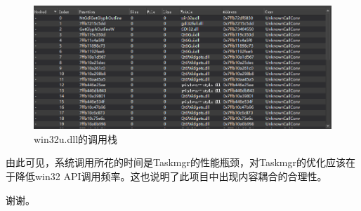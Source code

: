 \documentclass{beamer}
\begin{document}
\begin{frame}
    \begin{figure}
        \centering
        \includegraphics[scale=0.33]{../media/performance analyze/14.878s sampling result 2 callstuck.png}
        \caption{win32u.dll的调用栈}
        \label{fig:qorbit.2}
    \end{figure}
    
    由此可见，系统调用所花的时间是Taskmgr的性能瓶颈，对Taskmgr的优化应该在于降低win32 API调用频率。这也说明了此项目中出现内容耦合的合理性。
\end{frame}

\begin{frame}
    谢谢。
\end{frame}
\end{document}
